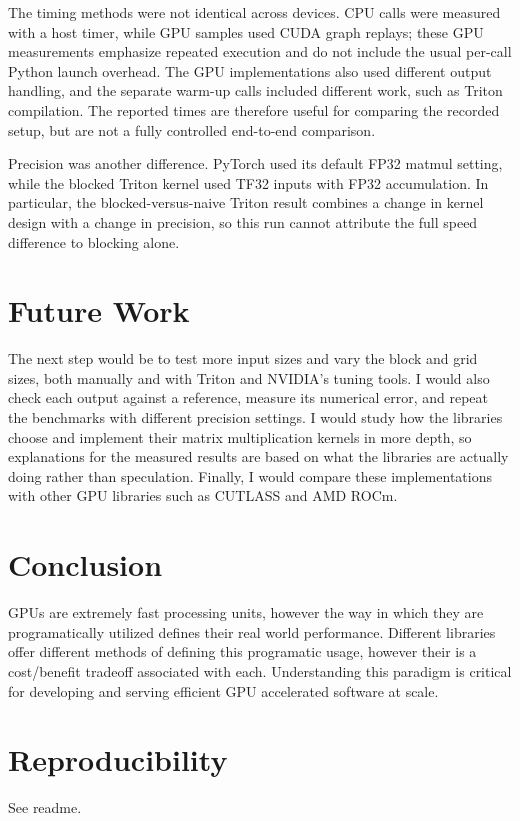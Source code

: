\documentclass[11pt,letterpaper]{article}
\begin{document}
The timing methods were not identical across devices. CPU calls were measured with a host timer, while GPU samples used CUDA graph replays; these GPU measurements emphasize repeated execution and do not include the usual per-call Python launch overhead. The GPU implementations also used different output handling, and the separate warm-up calls included different work, such as Triton compilation. The reported times are therefore useful for comparing the recorded setup, but are not a fully controlled end-to-end comparison.

Precision was another difference. PyTorch used its default FP32 matmul setting, while the blocked Triton kernel used TF32 inputs with FP32 accumulation. In particular, the blocked-versus-naive Triton result combines a change in kernel design with a change in precision, so this run cannot attribute the full speed difference to blocking alone. 

\section{Future Work}
The next step would be to test more input sizes and vary the block and grid sizes, both manually and with Triton and NVIDIA's tuning tools. I would also check each output against a reference, measure its numerical error, and repeat the benchmarks with different precision settings. I would study how the libraries choose and implement their matrix multiplication kernels in more depth, so explanations for the measured results are based on what the libraries are actually doing rather than speculation. Finally, I would compare these implementations with other GPU libraries such as CUTLASS and AMD ROCm.

\section{Conclusion}
GPUs are extremely fast processing units, however the way in which they are programatically utilized defines their real world performance. Different libraries offer different methods of defining this programatic usage, however their is a cost/benefit tradeoff associated with each. Understanding this paradigm is critical for developing and serving efficient GPU accelerated software at scale.

\section*{Reproducibility}
See readme.
\end{document}
